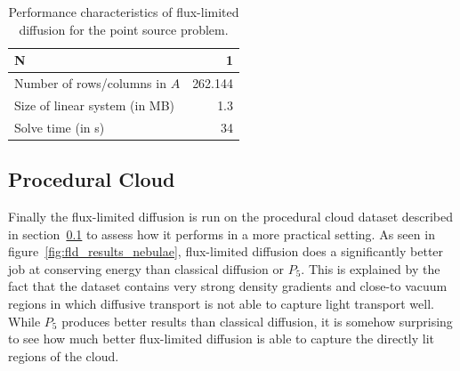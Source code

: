 \begin{table}[!h]
	\centering
	\caption{Performance characteristics of flux-limited diffusion for the point source problem.}
	\label{tab:results_pointsource}
	\begin{tabular}{l r}
    \hline
	\textbf{N}
    & 1
    \\
    \hline
    Number of rows/columns in $A$
    & 262.144
    \\
    Size of linear system (in MB)
    & 1.3
    \\
    Solve time (in s)
    & 34
	\end{tabular}
\end{table}

%

\subsection{Procedural Cloud}
\label{sec:pn_results_clouds}

Finally the flux-limited diffusion is run on the procedural cloud dataset described in section~\ref{sec:pn_results_clouds} to assess how it performs in a more practical setting. As seen in figure~\ref{fig:fld_results_nebulae}, flux-limited diffusion does a significantly better job at conserving energy than classical diffusion or $P_5$. This is explained by the fact that the dataset contains very strong density gradients and close-to vacuum regions in which diffusive transport is not able to capture light transport well. While $P_5$ produces better results than classical diffusion, it is somehow surprising to see how much better flux-limited diffusion is able to capture the directly lit regions of the cloud.


